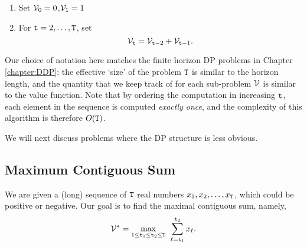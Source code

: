 \begin{enumerate}
    \item Set $\mathcal{V}_{0} = 0$,$\mathcal{V}_1 = 1$ 
    \item For ${\tt t} = 2, \ldots, {\tt T}$, set
    \begin{equation*}
        \mathcal{V}_{{\tt t}} = \mathcal{V}_{{{\tt t}}-2} + \mathcal{V}_{{{\tt t}}-1}.
    \end{equation*}
\end{enumerate}

Our choice of notation here matches the finite horizon DP problems in Chapter \ref{chapter:DDP}: the effective `size' of the problem ${\tt T}$ is similar to the horizon length, and the quantity that we keep track of for each sub-problem $\mathcal{V}$ is similar to the value function. Note that by ordering the computation in increasing ${\tt t}$, each element in the sequence is computed \textit{exactly once}, and the complexity of this algorithm is therefore $O({\tt T})$.

We will next discuss problems where the DP structure is less obvious.

\subsection*{Maximum Contiguous Sum}
We are given a (long) sequence of ${\tt T}$ real numbers ${x_1},{x_2}, \ldots ,{x_{\tt T}}$, which could be positive or negative. Our goal is to find the maximal contiguous sum, namely,
\[{\mathcal{V}^*} = \mathop {\max }\limits_{1 \leq {\tt t}_1 \leq {\tt t}_2 \le {\tt T}} \;\,\sum\limits_{\ell  = {\tt t}_1}^{{\tt t}_2} {{x_\ell }} .\]

